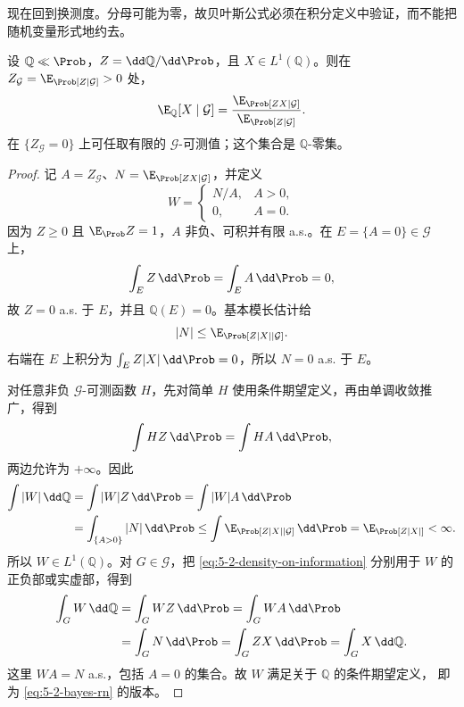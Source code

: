 现在回到换测度。分母可能为零，故贝叶斯公式必须在积分定义中验证，而不能把随机变量形式地约去。

\begin{theorem}\label{theorem:5-2-3-4}
设 $\mathbb Q\ll\Prob$，$Z=\dd\mathbb Q/\dd\Prob$，且
$X\in L^1(\mathbb Q)$。则在
$Z_{\mathcal G}=\E_\Prob[Z\mid\mathcal G]>0$ 处，
\begin{equation}\label{eq:5-2-bayes-rn}
 \E_\mathbb Q[X\mid\mathcal G]
 =\frac{\E_\Prob[ZX\mid\mathcal G]}
 {\E_\Prob[Z\mid\mathcal G]}.
\end{equation}
在 $\{Z_{\mathcal G}=0\}$ 上可任取有限的 $\mathcal G$-可测值；这个集合是
$\mathbb Q$-零集。
\end{theorem}

\begin{proof}
记 $A=Z_{\mathcal G}$、$N=\E_\Prob[ZX\mid\mathcal G]$，并定义
\[
 W=\begin{cases}N/A,&A>0,\\0,&A=0.\end{cases}
\]
因为 $Z\geq0$ 且 $\E_\Prob Z=1$，$A$ 非负、可积并有限 a.s.。在
$E=\{A=0\}\in\mathcal G$ 上，
\[
 \int_EZ\,\dd\Prob=\int_EA\,\dd\Prob=0,
\]
故 $Z=0$ a.s. 于 $E$，并且 $\mathbb Q(E)=0$。基本模长估计给
\[
 |N|\leq\E_\Prob[Z|X|\mid\mathcal G].
\]
右端在 $E$ 上积分为 $\int_EZ|X|\,\dd\Prob=0$，所以 $N=0$ a.s. 于 $E$。

对任意非负 $\mathcal G$-可测函数 $H$，先对简单 $H$ 使用条件期望定义，再由单调收敛推广，得到
\begin{equation}\label{eq:5-2-density-on-information}
 \int HZ\,\dd\Prob=\int HA\,\dd\Prob,
\end{equation}
两边允许为 $+\infty$。因此
\[
 \begin{aligned}
 \int|W|\,\dd\mathbb Q
 &=\int|W|Z\,\dd\Prob
 =\int|W|A\,\dd\Prob\\
 &=\int_{\{A>0\}}|N|\,\dd\Prob
 \leq\int\E_\Prob[Z|X|\mid\mathcal G]\,\dd\Prob
 =\E_\Prob[Z|X|]<\infty.
 \end{aligned}
\]
所以 $W\in L^1(\mathbb Q)$。对 $G\in\mathcal G$，把
\eqref{eq:5-2-density-on-information} 分别用于 $W$ 的正负部或实虚部，得到
\[
 \begin{aligned}
 \int_GW\,\dd\mathbb Q
 &=\int_GWZ\,\dd\Prob
 =\int_GWA\,\dd\Prob\\
 &=\int_GN\,\dd\Prob
 =\int_GZX\,\dd\Prob
 =\int_GX\,\dd\mathbb Q.
 \end{aligned}
\]
这里 $WA=N$ a.s.，包括 $A=0$ 的集合。故 $W$ 满足关于 $\mathbb Q$ 的条件期望定义，
即为 \eqref{eq:5-2-bayes-rn} 的版本。
\end{proof}

